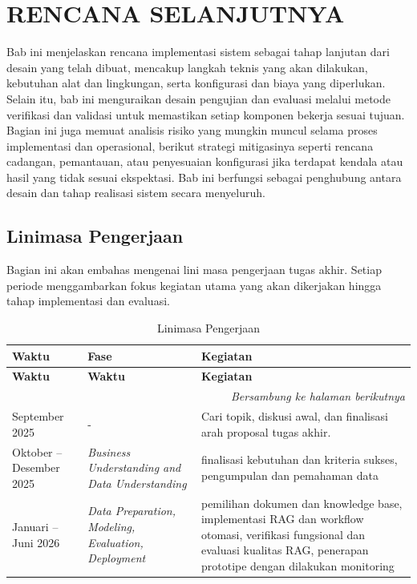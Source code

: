 \chapter{RENCANA SELANJUTNYA}
\label{chap:rencana-selanjutnya}

Bab ini menjelaskan rencana implementasi sistem sebagai tahap lanjutan dari desain yang telah dibuat, mencakup langkah teknis yang akan dilakukan, kebutuhan alat dan lingkungan, serta konfigurasi dan biaya yang diperlukan. 
Selain itu, bab ini menguraikan desain pengujian dan evaluasi melalui metode verifikasi dan validasi untuk memastikan setiap komponen bekerja sesuai tujuan. 
Bagian ini juga memuat analisis risiko yang mungkin muncul selama proses implementasi dan operasional, berikut strategi mitigasinya seperti rencana cadangan, pemantauan, atau penyesuaian konfigurasi jika terdapat kendala atau hasil yang tidak sesuai ekspektasi. Bab ini berfungsi sebagai penghubung antara desain dan tahap realisasi sistem secara menyeluruh.

\section{Linimasa Pengerjaan}
Bagian ini akan embahas mengenai lini masa pengerjaan tugas akhir. Setiap periode menggambarkan fokus kegiatan utama yang akan dikerjakan hingga tahap implementasi dan evaluasi. 

\begin{longtable}{|p{3cm}|p{3cm}|p{7cm}|}
\caption{Linimasa Pengerjaan}
\label{tbl:Linimasa} \\
\hline
\textbf{Waktu} & \textbf{Fase} & \textbf{Kegiatan} \\
\hline
\endfirsthead

\hline
\textbf{Waktu} & \textbf{Waktu} & \textbf{Kegiatan} \\
\hline
\endhead

\hline
\multicolumn{3}{r}{\textit{Bersambung ke halaman berikutnya}} \\
\endfoot

\hline
\endlastfoot

September 2025
&
-
&
Cari topik, diskusi awal, dan finalisasi arah proposal tugas akhir.
\\ \hline

Oktober – Desember 2025
&
\textit{Business Understanding and Data Understanding}
&
finalisasi kebutuhan dan kriteria sukses, pengumpulan dan pemahaman data
\\ \hline

Januari – Juni 2026
&
\textit{Data Preparation, Modeling, Evaluation, Deployment}
&
pemilihan dokumen dan knowledge base,
implementasi RAG dan workflow otomasi,
verifikasi fungsional dan evaluasi kualitas RAG,
penerapan prototipe dengan dilakukan monitoring
\\ \hline
\end{longtable}


